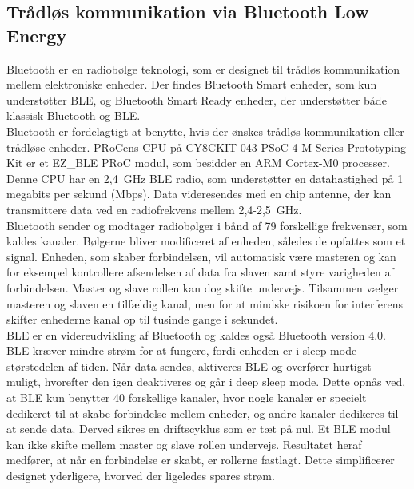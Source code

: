 \subsection{Trådløs kommunikation via Bluetooth Low Energy} 
Bluetooth er en radiobølge teknologi, som er designet til trådløs kommunikation mellem elektroniske enheder. Der findes Bluetooth Smart enheder, som kun understøtter BLE, og Bluetooth Smart Ready enheder, der understøtter både klassisk Bluetooth og BLE.~\citep{Sauter2011,Gupta2013}\\
Bluetooth er fordelagtigt at benytte, hvis der ønskes trådløs kommunikation eller trådløse enheder. PRoCens CPU på CY8CKIT-043 PSoC 4 M-Series Prototyping Kit er et EZ\_BLE PRoC modul, som besidder en ARM Cortex-M0 processer. Denne CPU har en 2,4~GHz BLE radio, som understøtter en datahastighed på 1 megabits per sekund (Mbps). Data videresendes med en chip antenne, der kan transmittere data ved en radiofrekvens mellem 2,4-2,5~GHz.~\citep{Semiconductor2016PRoC,Semiconductor2016BLEdyb}\\
Bluetooth sender og modtager radiobølger i bånd af 79 forskellige frekvenser, som kaldes kanaler. Bølgerne bliver modificeret af enheden, således de opfattes som et signal. Enheden, som skaber forbindelsen, vil automatisk være masteren og kan for eksempel kontrollere afsendelsen af data fra slaven samt styre varigheden af forbindelsen. Master og slave rollen kan dog skifte undervejs. Tilsammen vælger masteren og slaven en tilfældig kanal, men for at mindske risikoen for interferens skifter enhederne kanal op til tusinde gange i sekundet.~\citep{CYPRESS2016workshopBLE,Sauter2011} \\
BLE er en videreudvikling af Bluetooth og kaldes også Bluetooth version 4.0. BLE kræver mindre strøm for at fungere, fordi enheden er i sleep mode størstedelen af tiden. Når data sendes, aktiveres BLE og overfører hurtigst muligt, hvorefter den igen deaktiveres og går i deep sleep mode. Dette opnås ved, at BLE kun benytter 40 forskellige kanaler, hvor nogle kanaler er specielt dedikeret til at skabe forbindelse mellem enheder, og andre kanaler dedikeres til at sende data. Derved sikres en driftscyklus som er tæt på nul. Et BLE modul kan ikke skifte mellem master og slave rollen undervejs. Resultatet heraf medfører, at når en forbindelse er skabt, er rollerne fastlagt. Dette simplificerer designet yderligere, hvorved der ligeledes spares strøm.~\citep{Gupta2013}